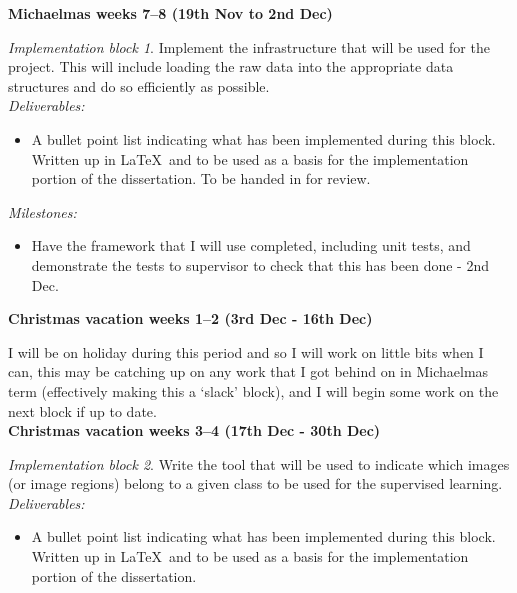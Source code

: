 \documentclass[12pt,a4paper,twoside]{article}
\begin{document}
{\bf Michaelmas weeks 7--8 (19th Nov to 2nd Dec)} 

{\em Implementation block 1}. Implement the infrastructure that will be used for 
the project. This will include loading the raw data into the appropriate data 
structures and do so efficiently as possible. \\

{\em Deliverables:} 
\begin{itemize} 
    \item 
    A bullet point list indicating what has been implemented during this block. 
    Written up in \LaTeX\ and to be used as a basis for the implementation 
    portion of the dissertation. To be handed in for review.
\end{itemize}

{\em Milestones:}
\begin{itemize}
    \item 
    Have the framework that I will use completed, including unit tests, and 
    demonstrate the tests to supervisor to check that this has been done - 2nd 
    Dec.
\end{itemize}




{\bf Christmas vacation weeks 1--2 (3rd Dec - 16th Dec)} 

I will be on holiday during this period and so I will work on little bits 
when I can, this may be catching up on any work that I got behind on in 
Michaelmas term (effectively making this a `slack' block), and I will begin 
some work on the next block if up to date. \\






{\bf Christmas vacation weeks 3--4 (17th Dec - 30th Dec)} 

{\em Implementation block 2}. Write the tool that will be used to indicate 
which images (or image regions) belong to a given class to be used for the 
supervised learning. \\

{\em Deliverables:} 
\begin{itemize} 
    \item 
    A bullet point list indicating what has been implemented during this block. 
    Written up in \LaTeX\ and to be used as a basis for the implementation 
    portion of the dissertation.
\end{itemize}
\end{document}
